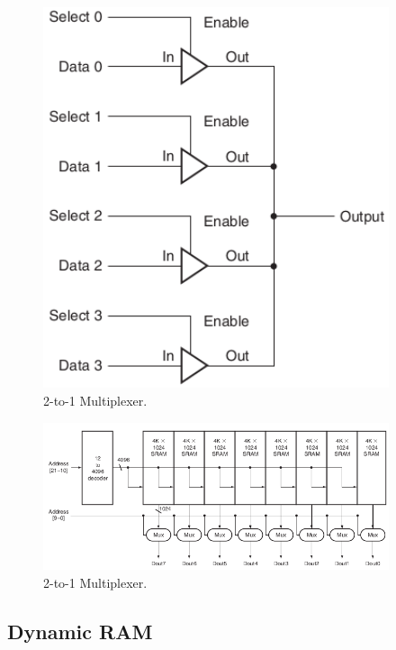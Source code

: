 \documentclass[a4paper, 11pt,oneside]{article}
\begin{document}
\begin{figure}[H]
	\begin{center}
	\includegraphics[width=4in]{sram1.png}
	\caption{2-to-1 Multiplexer.}
	\label{fig:mux} 
	\end{center}
\end{figure}

\begin{figure}[H]
	\begin{center}
	\includegraphics[width=4in]{sram2.png}
	\caption{2-to-1 Multiplexer.}
	\label{fig:mux} 
	\end{center}
\end{figure}



\subsection{Dynamic RAM}
\end{document}
